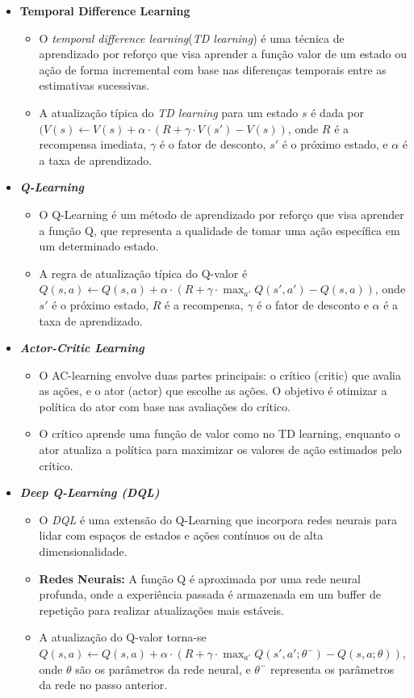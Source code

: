 \begin{itemize}
	\item \textbf{Temporal Difference Learning}
	\begin{itemize}
		\item O \textit{temporal difference learning}(\textit{TD learning}) é uma técnica de aprendizado por reforço que visa aprender a função valor de um estado ou ação de forma incremental com base nas diferenças temporais entre as estimativas sucessivas.
		\item A atualização típica do \textit{TD learning} para um estado $s$ é dada por $(V(s) \leftarrow V(s) + \alpha \cdot (R + \gamma \cdot V(s') - V(s))$, onde $R$ é a recompensa imediata, $\gamma$ é o fator de desconto, $s'$ é o próximo estado, e $\alpha$ é a taxa de aprendizado.
	\end{itemize}
	
	\item \textbf{\textit{Q-Learning}}
	\begin{itemize}
		\item O Q-Learning é um método de aprendizado por reforço que visa aprender a função Q, que representa a qualidade de tomar uma ação específica em um determinado estado.
		\item A regra de atualização típica do Q-valor é $Q(s, a) \leftarrow Q(s, a) + \alpha \cdot (R + \gamma \cdot \max_{a'} Q(s', a') - Q(s, a))$, onde $s'$ é o próximo estado, $R$ é a recompensa, $\gamma$ é o fator de desconto e $\alpha$ é a taxa de aprendizado.
	\end{itemize}
	
	\item \textbf{\textit{Actor-Critic Learning}}
	\begin{itemize}
		\item O AC-learning envolve duas partes principais: o crítico (critic) que avalia as ações, e o ator (actor) que escolhe as ações. O objetivo é otimizar a política do ator com base nas avaliações do crítico.
		\item O crítico aprende uma função de valor como no TD learning, enquanto o ator atualiza a política para maximizar os valores de ação estimados pelo crítico.
	\end{itemize}
	
	\item \textbf{\textit{Deep Q-Learning (DQL)}}
	\begin{itemize}
		\item O \textit{DQL} é uma extensão do Q-Learning que incorpora redes neurais para lidar com espaços de estados e ações contínuos ou de alta dimensionalidade.
		\item \textbf{Redes Neurais:} A função Q é aproximada por uma rede neural profunda, onde a experiência passada é armazenada em um buffer de repetição para realizar atualizações mais estáveis.
		\item A atualização do Q-valor torna-se $Q(s, a) \leftarrow Q(s, a) + \alpha \cdot (R + \gamma \cdot \max_{a'} Q(s', a'; \theta^-) - Q(s, a; \theta))$, onde $\theta$ são os parâmetros da rede neural, e $\theta^-$ representa os parâmetros da rede no passo anterior.
	\end{itemize}
\end{itemize}

